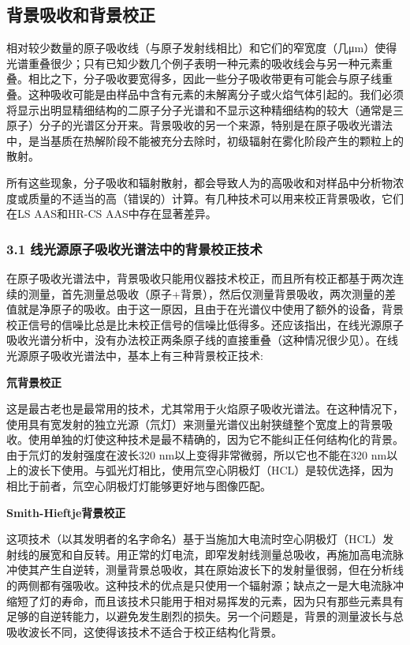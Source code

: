 \subsection{背景吸收和背景校正}

相对较少数量的原子吸收线（与原子发射线相比）和它们的窄宽度（几μm）使得光谱重叠很少；只有已知少数几个例子表明一种元素的吸收线会与另一种元素重叠。相比之下，分子吸收要宽得多，因此一些分子吸收带更有可能会与原子线重叠。这种吸收可能是由样品中含有元素的未解离分子或火焰气体引起的。我们必须将显示出明显精细结构的二原子分子光谱和不显示这种精细结构的较大（通常是三原子）分子的光谱区分开来。背景吸收的另一个来源，特别是在原子吸收光谱法中，是当基质在热解阶段不能被充分去除时，初级辐射在雾化阶段产生的颗粒上的散射。

所有这些现象，分子吸收和辐射散射，都会导致人为的高吸收和对样品中分析物浓度或质量的不适当的高（错误的）计算。有几种技术可以用来校正背景吸收，它们在LS AAS和HR-CS AAS中存在显著差异。

\subsubsection{3.1 线光源原子吸收光谱法中的背景校正技术}

在原子吸收光谱法中，背景吸收只能用仪器技术校正，而且所有校正都基于两次连续的测量，首先测量总吸收（原子+背景），然后仅测量背景吸收，两次测量的差值就是净原子的吸收。由于这一原因，且由于在光谱仪中使用了额外的设备，背景校正信号的信噪比总是比未校正信号的信噪比低得多。还应该指出，在线光源原子吸收光谱分析中，没有办法校正两条原子线的直接重叠（这种情况很少见）。在线光源原子吸收光谱法中，基本上有三种背景校正技术:

\textbf{氘背景校正}

这是最古老也是最常用的技术，尤其常用于火焰原子吸收光谱法。在这种情况下，使用具有宽发射的独立光源（氘灯）来测量光谱仪出射狭缝整个宽度上的背景吸收。使用单独的灯使这种技术是最不精确的，因为它不能纠正任何结构化的背景。由于氘灯的发射强度在波长320 nm以上变得非常微弱，所以它也不能在320 nm以上的波长下使用。与弧光灯相比，使用氘空心阴极灯（HCL）是较优选择，因为相比于前者，氘空心阴极灯灯能够更好地与图像匹配。

\textbf{Smith-Hieftje背景校正}

这项技术（以其发明者的名字命名）基于当施加大电流时空心阴极灯（HCL）发射线的展宽和自反转。用正常的灯电流，即窄发射线测量总吸收，再施加高电流脉冲使其产生自逆转，测量背景总吸收，其在原始波长下的发射量很弱，但在分析线的两侧都有强吸收。这种技术的优点是只使用一个辐射源；缺点之一是大电流脉冲缩短了灯的寿命，而且该技术只能用于相对易挥发的元素，因为只有那些元素具有足够的自逆转能力，以避免发生剧烈的损失。另一个问题是，背景的测量波长与总吸收波长不同，这使得该技术不适合于校正结构化背景。
